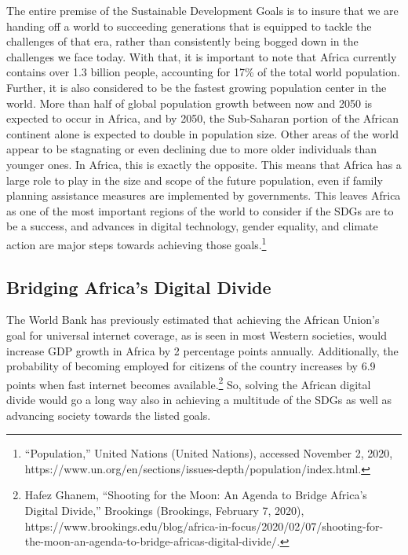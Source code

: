 \documentclass[10pt, letterpaper]{article}
\begin{document}
The entire premise of the Sustainable Development Goals is to insure
that we are handing off a world to succeeding generations that is
equipped to tackle the challenges of that era, rather than consistently
being bogged down in the challenges we face today. With that, it is
important to note that Africa currently contains over 1.3 billion
people, accounting for 17\% of the total world population. Further, it
is also considered to be the fastest growing population center in the
world. More than half of global population growth between now and 2050
is expected to occur in Africa, and by 2050, the Sub-Saharan portion of
the African continent alone is expected to double in population size.
Other areas of the world appear to be stagnating or even declining due
to more older individuals than younger ones. In Africa, this is exactly
the opposite. This means that Africa has a large role to play in the
size and scope of the future population, even if family planning
assistance measures are implemented by governments. This leaves Africa
as one of the most important regions of the world to consider if the
SDGs are to be a success, and advances in digital technology, gender
equality, and climate action are major steps towards achieving those
goals.\footnote{``Population,'' United Nations (United Nations),
  accessed November 2, 2020,
  https://www.un.org/en/sections/issues-depth/population/index.html.} \\

\subsection{Bridging Africa's Digital Divide}

The World Bank has previously estimated that achieving the African
Union's goal for universal internet coverage, as is seen in most Western
societies, would increase GDP growth in Africa by 2 percentage points
annually. Additionally, the probability of becoming employed for
citizens of the country increases by 6.9 points when fast internet
becomes available.\footnote{Hafez Ghanem, ``Shooting for the Moon: An
  Agenda to Bridge Africa's Digital Divide,'' Brookings (Brookings,
  February 7, 2020),
  https://www.brookings.edu/blog/africa-in-focus/2020/02/07/shooting-for-the-moon-an-agenda-to-bridge-africas-digital-divide/.}
So, solving the African digital divide would go a long way also in
achieving a multitude of the SDGs as well as advancing society towards
the listed goals. \\
\end{document}

